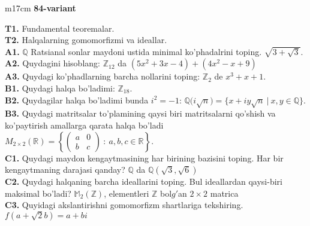 \documentclass{article}
\begin{document}
\begin{tabular}{m{17cm}}
\textbf{84-variant}
\newline

\textbf{T1.} Fundamental teoremalar. \\
\textbf{T2.} Halqalarning gomomorfizmi va ideallar. \\
\textbf{A1.} \(\mathbb{Q}\) Ratsianal sonlar maydoni ustida minimal ko'phadalrini toping.
\(\sqrt{3 + \sqrt{3}}\). \\
\textbf{A2.} Quydagini hisoblang:
\(\mathbb{Z}_{12}\) da \(\left( 5x^{2} + 3x - 4 \right) + \left( 4x^{2} - x + 9 \right)\) \\
\textbf{A3.} Quydagi ko'phadlarning barcha nollarini toping:
\(\mathbb{Z}_{2}\) de \(x^{3} + x + 1\). \\
\textbf{B1.} Quydagi halqa bo'ladimi:
\(\mathbb{Z}_{18}\). \\
\textbf{B2.} Quydagilar halqa bo'ladimi bunda \(i^{2} = - 1\):
\(\mathbb{Q(}i\sqrt{n}) = \{ x + iy\sqrt{n}\ |\ x,y \in \mathbb{Q\}}\). \\
\textbf{B3.} Quydagi matritsalar to'plamining qaysi biri matritsalarni qo'shish va ko'paytirish amallarga qarata halqa bo'ladi
\(M_{2 \times 2}\mathbb{(R) =}\left\{ \begin{pmatrix}
a & 0 \\
b & c
\end{pmatrix}\ :\ a,b,c \in \mathbb{R} \right\}\). \\
\textbf{C1.} Quydagi maydon kengaytmasining har birining bazisini toping. Har bir kengaytmaning darajasi qanday?
\(\mathbb{Q}\) da \(\mathbb{Q}\left( \sqrt{3},\sqrt{6} \right)\) \\
\textbf{C2.} Quydagi halqaning barcha ideallarini toping. Bul ideallardan qaysi-biri maksimal bo'ladi?
\(\mathbb{M}_{2}\left( \mathbb{Z} \right)\), elementleri \(\mathbb{Z}\) bol\(g'\)an \(2 \times 2\) matrica \\
\textbf{C3.} Quyidagi akslantirishni gomomorfizm shartlariga tekshiring. \(f\left( a + \sqrt{2}b \right) = a + bi\) \\

\end{tabular}
\vspace{1cm}
\end{document}
